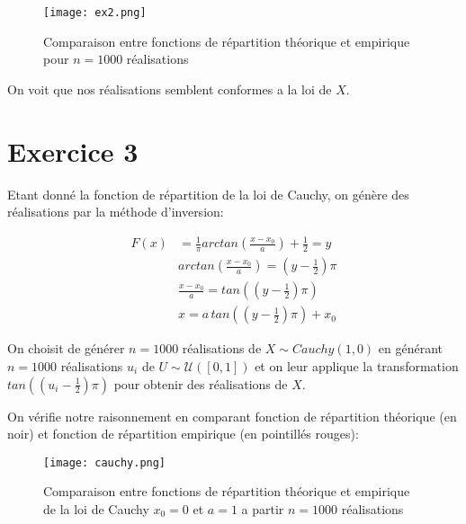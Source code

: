 \documentclass{article}
\begin{document}
\begin{multicols}{2}
\begin{figure}[H]
    \begin{center}
        \texttt{[image: ex2.png]}
        \centering
        \captionsetup{justification=centering}
        \caption{\label{fig:ex2}Comparaison entre fonctions de répartition théorique et empirique pour $n = 1000$ réalisations}
    \end{center}
\end{figure}

On voit que nos réalisations semblent conformes a la loi de $X$.


\section{Exercice 3}\label{sec:ex3}

Etant donné la fonction de répartition de la loi de Cauchy, on génère des
réalisations par la méthode d'inversion:

\begin{equation}
    \begin{split}
        F(x) &= \frac{1}{\pi} arctan\left(\frac{x - x_0}{a}\right) + \frac{1}{2} = y \\
             & arctan\left(\frac{x - x_0}{a}\right) = \left(y - \frac{1}{2}\right) \pi \\
             & \frac{x - x_0}{a} = tan\left(\left(y - \frac{1}{2}\right) \pi \right) \\
             & x = a \, tan\left(\left(y - \frac{1}{2}\right) \pi \right) + x_0
    \end{split}
\end{equation}

On choisit de générer $n = 1000$ réalisations de $X \sim Cauchy(1, 0)$ en
générant $n = 1000$ réalisations $u_i$ de $U \sim \mathcal{U}([0, 1])$ et on
leur applique la transformation
$tan\left(\left(u_i - \frac{1}{2}\right) \pi \right)$ pour obtenir des
réalisations de $X$.

On vérifie notre raisonnement en comparant fonction de répartition théorique (en
noir) et fonction de répartition empirique (en pointillés rouges):

\begin{figure}[H]
    \begin{center}
        \texttt{[image: cauchy.png]}
        \centering
        \captionsetup{justification=centering}
        \caption{\label{fig:cauchy}Comparaison entre fonctions de répartition théorique et empirique de la loi de Cauchy $x_0 = 0$ et $a = 1$ a partir $n = 1000$ réalisations}
    \end{center}
\end{figure}


\end{multicols}
\end{document}

